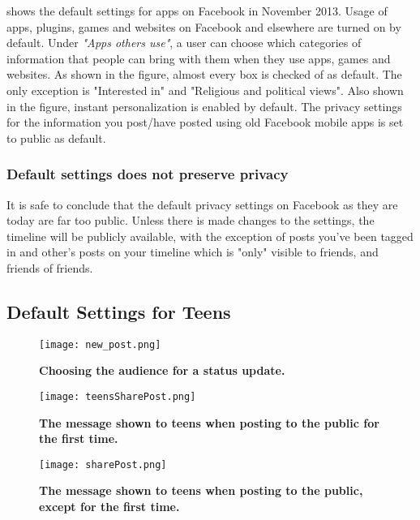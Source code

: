  shows the default settings for apps on Facebook in November 2013. Usage of apps, plugins, games and websites on Facebook and elsewhere are turned on by default. Under \textit{"Apps others use"}, a user can choose which categories of information that people can bring with them when they use apps, games and websites. As shown in the figure, almost every box is checked of as default. The only exception is "Interested in" and "Religious and political views". Also shown in the figure, instant personalization is enabled by default. The privacy settings for the information you post/have posted using old Facebook mobile apps is set to public as default. 

\subsubsection{Default settings does not preserve privacy} It is safe to conclude that the default privacy settings on Facebook as they are today are far too public. Unless there is made changes to the settings, the timeline will be publicly available, with the exception of posts you've been tagged in and other's posts on your timeline which is "only" visible to friends, and friends of friends. 

\subsection{Default Settings for Teens}

\begin{figure}[t]
\centering
\texttt{[image: new\_post.png]}
\caption[Choosing who can see a status update.]{\textbf{Choosing the audience for a status update.}}
\label{fig:newPost}
\end{figure}

\begin{figure}[b]
\centering
\texttt{[image: teensSharePost.png]}
\caption[The message shown to teens when posting to the public for the first time]{\textbf{The message shown to teens when posting to the public for the first time.}} 
\label{fig:teensSharePost}
\end{figure}

\begin{figure}[t]
\centering
\texttt{[image: sharePost.png]}
\caption [The message shown to teens when posting to the public, except for the first time]{\textbf{The message shown to teens when posting to the public, except for the first time.}} 
\label{fig:sharePost}
\end{figure}

